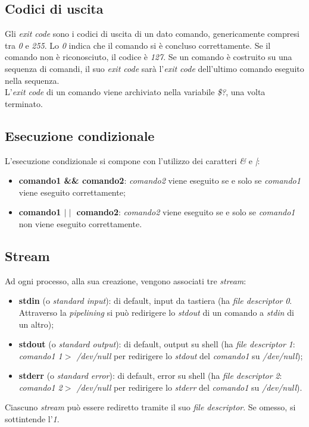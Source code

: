 \subsection{Codici di uscita}
Gli \textit{exit code} sono i codici di uscita di un dato comando, genericamente compresi tra \textit{0} e \textit{255}. Lo \textit{0} indica che il comando si è concluso correttamente. Se il comando non è riconosciuto, il codice è \textit{127}. Se un comando è costruito su una sequenza di comandi, il suo \textit{exit code} sarà l'\textit{exit code} dell'ultimo comando eseguito nella sequenza. \\
L'\textit{exit code} di un comando viene archiviato nella variabile \textit{\$?}, una volta terminato.

\subsection{Esecuzione condizionale}
L'esecuzione condizionale si compone con l'utilizzo dei caratteri \textit{\&} e \textit{|}:
\begin{itemize}
	\item \textbf{comando1 \&\& comando2}: \textit{comando2} viene eseguito se e solo se \textit{comando1} viene eseguito correttamente;
	\item \textbf{comando1 $\mid\mid$ comando2}: \textit{comando2} viene eseguito se e solo se \textit{comando1} non viene eseguito correttamente.
\end{itemize}

\subsection{Stream}
Ad ogni processo, alla sua creazione, vengono associati tre \textit{stream}:
\begin{itemize}
	\item \textbf{stdin} (o \textit{standard input}): di default, input da tastiera (ha \textit{file descriptor} \textit{0}. Attraverso la \textit{pipelining} si può redirigere lo \textit{stdout} di un comando a \textit{stdin} di un altro);
	\item \textbf{stdout} (o \textit{standard output}): di default, output su shell (ha \textit{file descriptor} \textit{1}: \textit{comando1 1$>$ /dev/null} per redirigere lo \textit{stdout} del \textit{comando1} su \textit{/dev/null});
	\item \textbf{stderr} (o \textit{standard error}): di default, error su shell (ha \textit{file descriptor} \textit{2}: \textit{comando1 2$>$ /dev/null} per redirigere lo \textit{stderr} del \textit{comando1} su \textit{/dev/null}).
\end{itemize}
Ciascuno \textit{stream} può essere rediretto tramite il suo \textit{file descriptor}. Se omesso, si sottintende l'\textit{1}.

